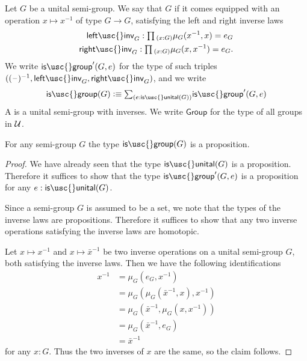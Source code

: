 \begin{defn}
  Let $G$ be a unital semi-group. We say that $G$  if it comes equipped with an operation $x\mapsto x^{-1}$ of type $G\to G$, satisfying the left and right inverse laws
  \begin{align*}
    \mathsf{left\usc{}inv}_G : \prd{x:G}\mu_G(x^{-1},x)=e_G \\
    \mathsf{right\usc{}inv}_G : \prd{x:G}\mu_G(x,x^{-1}) = e_G.
  \end{align*}
  We write $\mathsf{is\usc{}group}'(G,e)$ for the type of such triples $((\blank)^{-1},\mathsf{left\usc{}inv}_G,\mathsf{right\usc{}inv}_G)$, and we write
  \begin{equation*}
    \mathsf{is\usc{}group}(G)\defeq\sm{e:\mathsf{is\usc{}unital}(G)}\mathsf{is\usc{}group}'(G,e)
  \end{equation*}
  A  is a unital semi-group with inverses. We write $\mathsf{Group}$ for the type of all groups in $\mathcal{U}$.
\end{defn}

\begin{lem}
  For any semi-group $G$ the type $\mathsf{is\usc{}group}(G)$ is a proposition.
\end{lem}

\begin{proof}
  We have already seen that the type $\mathsf{is\usc{}unital}(G)$ is a proposition. Therefore it suffices to show that the type $\mathsf{is\usc{}group}'(G,e)$ is a proposition for any $e:\mathsf{is\usc{}unital}(G)$.

  Since a semi-group $G$ is assumed to be a set, we note that the types of the inverse laws are propositions. Therefore it suffices to show that any two inverse operations satisfying the inverse laws are homotopic.

  Let $x\mapsto x^{-1}$ and $x\mapsto \bar{x}^{-1}$ be two inverse operations on a unital semi-group $G$, both satisfying the inverse laws. Then we have the following identifications
  \begin{align*}
    x^{-1} & = \mu_G(e_G,x^{-1}) \\
    & = \mu_G(\mu_G(\bar{x}^{-1},x),x^{-1}) \\
    & = \mu_G(\bar{x}^{-1},\mu_G(x,x^{-1})) \\
    & = \mu_G(\bar{x}^{-1},e_G) \\
    & = \bar{x}^{-1}
  \end{align*}
  for any $x:G$. Thus the two inverses of $x$ are the same, so the claim follows.
\end{proof}


